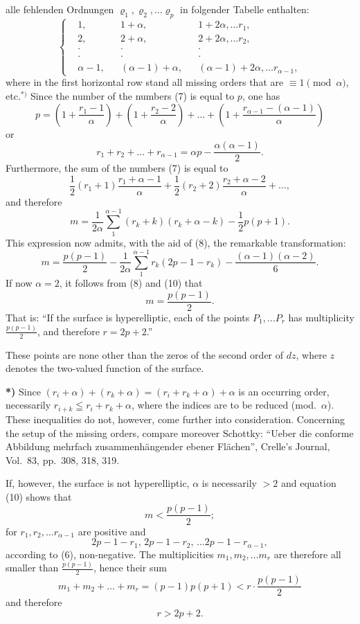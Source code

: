 \documentclass{article}
\begin{document}
alle fehlenden Ordnungen $\varrho_1, \varrho_2, \dots \varrho_p$ in folgender Tabelle enthalten:
\[
\left\{
\begin{aligned}
&1, & &1 + \alpha, & &1 + 2\alpha, \dots r_1, \\
&2, & &2 + \alpha, & &2 + 2\alpha, \dots r_2, \\
&\cdot & &\cdot & &\cdot \\
&\cdot & &\cdot & &\cdot \\
&\alpha - 1, & &(\alpha - 1) + \alpha, & &(\alpha - 1) + 2\alpha, \dots r_{\alpha-1},
\end{aligned}
\right.
\tag{7}
\]
where in the first horizontal row stand all missing orders that are $\equiv 1 \pmod \alpha$, etc.${}^{*)}$ Since the number of the numbers (7) is equal to $p$, one has
\[
p = \left(1 + \frac{r_1 - 1}{\alpha}\right) + \left(1 + \frac{r_2 - 2}{\alpha}\right) + \dots + \left(1 + \frac{r_{\alpha-1} - (\alpha - 1)}{\alpha}\right)
\]
or
\[
r_1 + r_2 + \dots + r_{\alpha-1} = \alpha p - \frac{\alpha(\alpha - 1)}{2}.
\tag{8}
\]
Furthermore, the sum of the numbers (7) is equal to
\[
\frac{1}{2}(r_1 + 1)\frac{r_1 + \alpha - 1}{\alpha} + \frac{1}{2}(r_2 + 2)\frac{r_2 + \alpha - 2}{\alpha} + \dots,
\]
and therefore
\[
m = \frac{1}{2\alpha} \sum_1^{\alpha-1} (r_k + k)(r_k + \alpha - k) - \frac{1}{2} p(p+1).
\tag{9}
\]
This expression now admits, with the aid of (8), the remarkable transformation:
\[
m = \frac{p(p-1)}{2} - \frac{1}{2\alpha} \sum_1^{\alpha-1} r_k(2p - 1 - r_k) - \frac{(\alpha-1)(\alpha-2)}{6}.
\tag{10}
\]
If now $\alpha = 2$, it follows from (8) and (10) that
\[
m = \frac{p(p-1)}{2}.
\]
That is: ``If the surface is hyperelliptic, each of the points $P_1, \dots P_r$ has multiplicity $\frac{p(p-1)}{2}$, and therefore $r = 2p+2$.''

These points are none other than the zeros of the second order of $dz$, where $z$ denotes the two-valued function of the surface.

\textbf{*)} Since $(r_i + \alpha) + (r_k + \alpha) = (r_i + r_k + \alpha) + \alpha$ is an occurring order, necessarily $r_{i+k} \leqq r_i + r_k + \alpha$, where the indices are to be reduced (mod.~$\alpha$). These inequalities do not, however, come further into consideration. Concerning the setup of the missing orders, compare moreover Schottky: ``Ueber die conforme Abbildung mehrfach zusammenhängender ebener Flächen'', Crelle's Journal, Vol.~83, pp.~308, 318, 319.

If, however, the surface is not hyperelliptic, $\alpha$ is necessarily $> 2$ and equation (10) shows that
\[
m < \frac{p(p-1)}{2};
\]
for $r_1, r_2, \dots r_{\alpha-1}$ are positive and
\[
2p - 1 - r_1,\, 2p - 1 - r_2,\, \dots 2p - 1 - r_{\alpha-1},
\]
according to (6), non-negative. The multiplicities $m_1, m_2, \dots m_r$ are therefore all smaller than $\frac{p(p-1)}{2}$, hence their sum
\[
m_1 + m_2 + \dots + m_r = (p-1)p(p+1) < r \cdot \frac{p(p-1)}{2}
\]
and therefore
\[
r > 2p + 2.
\]
\end{document}

